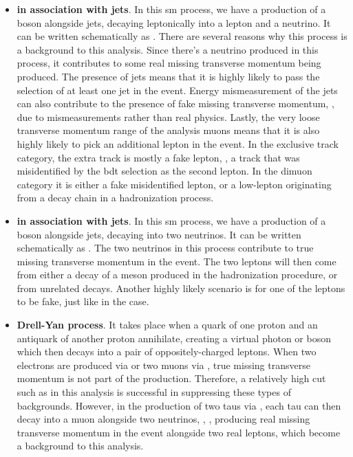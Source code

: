 \begin{itemize}
\item \textbf{\PW in association with jets}. In this \gls{sm} process, we have a production of a \PW boson alongside jets, decaying leptonically into a lepton and a neutrino. It can be written schematically as \wjets. There are several reasons why this process is a background to this analysis. Since there's a neutrino produced in this process, it contributes to some real missing transverse momentum being produced. The presence of jets means that it is highly likely to pass the selection of at least one jet in the event. Energy mismeasurement of the jets can also contribute to the presence of fake missing transverse momentum, \ie, \MET due to mismeasurements rather than real physics. Lastly, the very loose transverse momentum \pt range of the analysis muons means that it is also highly likely to pick an additional lepton in the event. In the exclusive track category, the extra track is mostly a fake lepton, \ie, a track that was misidentified by the \gls{bdt} selection as the second lepton. In the dimuon category it is either a fake misidentified lepton, or a low-\pt lepton originating from a decay chain in a hadronization process.

\item \textbf{\PZ in association with jets}. In this \gls{sm} process, we have a production of a \PZ boson alongside jets, decaying into two neutrinos. It can be written schematically as \mbox{\zjets}. The two neutrinos in this process contribute to true missing transverse momentum in the event. The two leptons will then come from either a decay of a meson produced in the hadronization procedure, or from unrelated decays. Another highly likely scenario is for one of the leptons to be fake, just like in the \wjets case.

\item \textbf{Drell-Yan process}. It takes place when a quark of one proton and an antiquark of another proton annihilate, creating a virtual photon or \PZst boson which then decays into a pair of oppositely-charged leptons. When two electrons are produced via \zee or two muons via \zmm, true missing transverse momentum is not part of the production. Therefore, a relatively high \MET cut such as in this analysis is successful in suppressing these types of backgrounds. However, in the production of two taus via \ztautau, each tau can then decay into a muon alongside two neutrinos, \ie, \tautomu, producing real missing transverse momentum in the event alongside two real leptons, which become a background to this analysis.


\end{itemize}

